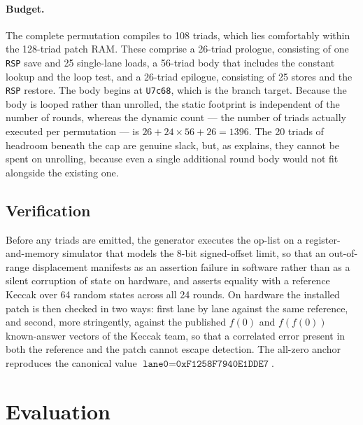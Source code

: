\paragraph{Budget.}
The complete permutation compiles to 108 triads, which lies comfortably within
the 128-triad patch RAM. These comprise a 26-triad prologue, consisting of one
\texttt{RSP} save and 25 single-lane loads, a 56-triad body that includes the
constant lookup and the loop test, and a 26-triad epilogue, consisting of 25
stores and the \texttt{RSP} restore. The body begins at \texttt{U7c68}, which is
the branch target. Because the body is looped rather than unrolled, the static
footprint is independent of the number of rounds, whereas the dynamic count ---
the number of triads actually executed per permutation --- is $26 +
24\times56 + 26 = 1396$. The 20 triads of headroom beneath the cap are genuine
slack, but, as  explains, they cannot be spent on
unrolling, because even a single additional round body would not fit alongside
the existing one.

\subsection{Verification}
\label{sec:keccak-verify}

Before any triads are emitted, the generator executes the op-list on a
register-and-memory simulator that models the 8-bit signed-offset limit, so that
an out-of-range displacement manifests as an assertion failure in software
rather than as a silent corruption of state on hardware, and asserts equality
with a reference Keccak over 64 random states across all 24 rounds. On hardware
the installed patch is then checked in two ways: first lane by lane against the
same reference, and second, more stringently, against the published $f(0)$ and
$f(f(0))$ known-answer vectors of the Keccak team, so that a correlated error
present in both the reference and the patch cannot escape detection. The
all-zero anchor reproduces the canonical value
$\texttt{lane0}=\texttt{0xF1258F7940E1DDE7}$.

\section{Evaluation}
\label{sec:keccak-eval}

